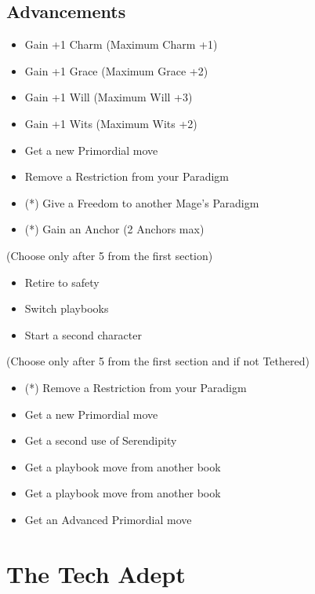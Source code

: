 \documentclass[10pt,twoside,openright]{memoir}
\begin{document}
\hypertarget{advancements-5}{%
\subsection{Advancements}\label{advancements-5}}

\begin{itemize}
\tightlist
\item
  Gain +1 Charm (Maximum Charm +1)
\item
  Gain +1 Grace (Maximum Grace +2)
\item
  Gain +1 Will (Maximum Will +3)
\item
  Gain +1 Wits (Maximum Wits +2)
\item
  Get a new Primordial move
\item
  Remove a Restriction from your Paradigm
\item
  (*) Give a Freedom to another Mage's Paradigm
\item
  (*) Gain an Anchor (2 Anchors max)
\end{itemize}

(Choose only after 5 from the first section)

\begin{itemize}
\tightlist
\item
  Retire to safety
\item
  Switch playbooks
\item
  Start a second character
\end{itemize}

(Choose only after 5 from the first section and if not Tethered)

\begin{itemize}
\tightlist
\item
  (*) Remove a Restriction from your Paradigm
\item
  Get a new Primordial move
\item
  Get a second use of Serendipity
\item
  Get a playbook move from another book
\item
  Get a playbook move from another book
\item
  Get an Advanced Primordial move
\end{itemize}

\newpage

\hypertarget{the-tech-adept}{%
\section{The Tech Adept}\label{the-tech-adept}}
\end{document}

